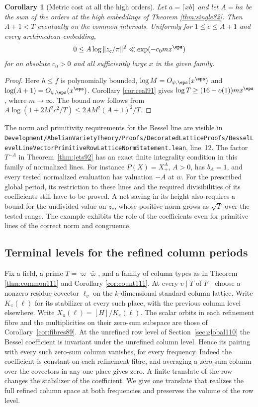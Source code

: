 \documentclass[a4paper,11pt]{article}
\newtheorem{corollary}[proposition]{Corollary}
\theoremstyle{definition}
\theoremstyle{remark}
\newcommand{\srcloc}[2]{{\small\nolinkurl{#1.lean}}, line~#2}
\numberwithin{equation}{section}
\begin{document}
\begin{corollary}[Metric cost at all the high orders]\label{cor:cost92}
Let \(a=\lceil xb\rceil\) and let \(A=ha\) be the sum of the
orders at the high embeddings of Theorem \ref{thm:single82}. Then
\(A+1<T\) eventually on the common intervals. Uniformly for
\(1\le c\le A+1\) and every archimedean embedding,
\[
       0\le A\log\|z_c/\pi\|^2
                  \ll \exp(-c_0 m x^\eps)
\]
for an absolute \(c_0>0\) and all sufficiently large \(x\)
in the given family.
\end{corollary}
\begin{proof}
Here \(h\le f\) is polynomially bounded,
\(\log M=O_{\psi,\eps}(x^\eps)\) and
\(\log(A+1)=O_{\psi,\eps}(x^\eps)\). Corollary \ref{cor:real91}
gives \(\log T\ge(16-o(1))m x^\eps\), where \(m\to\infty\).
The bound now follows from
\(A\log(1+2M^2c^2/T)\le 2A M^2(A+1)^2/T\).
\end{proof}

The norm and primitivity requirements for the Bessel line are
visible in
\srcloc{Development/AbelianVarietyTheory/Proofs/DecoratedLatticeProofs/BesselLevelLineVectorPrimitiveRowLatticeNormStatement}{12}.
The factor \(T^{-A}\) in Theorem~\ref{thm:jets92} has an exact
finite integrality condition in this family of normalized lines.
For instance \(P(X)=X_+^A\), \(A>0\), has \(b_A=1\), and every
tested normalized evaluation has valuation \(-A\) at \(w\).
For the prescribed global period, its restriction to these lines
and the required divisibilities of its coefficients still have
to be proved. A net saving in its height also requires a bound
for the undivided value on \(z_c\), whose positive norm grows
as \(\sqrt T\) over the tested range. The example exhibits the
role of the coefficients even for primitive lines of the correct
norm and congruence.

\subsection{Terminal levels for the refined column periods}\label{nav:VI-12}
\label{sec:refined112}

Fix a field, a prime \(T=\varpi\bar\varpi\), and a family of column
types as in Theorem \ref{thm:common111} and Corollary \ref{cor:count111}. At every \(v\mid T\) of \(F_+\)
choose a nonzero residue covector \(\ell_v\) on the \(k\)-dimensional
standard column lattice. Write \(K_\pi(\ell)\) for its stabilizer
at every such place, with the previous column level elsewhere.
Write \(X_\pi(\ell)=[H]/K_\pi(\ell)\). The scalar orbits in each
refinement fibre and the multiplicities on their zero-sum subspace
are those of Corollary~\ref{cor:fibres89}.
At the unrefined row level of Section~\ref{sec:global110} the
Bessel coefficient is invariant under the unrefined column level.
Hence its pairing with every such zero-sum column vanishes,
for every frequency. Indeed the coefficient is constant on each
refinement fibre, and averaging a zero-sum column over the
covectors in any one place gives zero. A finite translate of
the row changes the stabilizer of the coefficient. We give one
translate that realizes the full refined column space at both
frequencies and preserves the volume of the row level.
\end{document}
